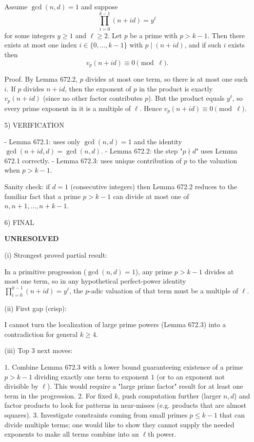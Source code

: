Assume $\gcd(n,d)=1$ and suppose
\[
\prod_{i=0}^{k-1}(n+id)=y^{\ell}
\]
for some integers $y\ge 1$ and $\ell\ge 2$.
Let $p$ be a prime with $p>k-1$. Then there exists at most one index $i\in\{0,\dots,k-1\}$ with $p\mid(n+id)$, and if such $i$ exists then
\[
 v_p(n+id)\equiv 0\pmod{\ell}.
\]

Proof.
By Lemma 672.2, $p$ divides at most one term, so there is at most one such $i$.
If $p$ divides $n+id$, then the exponent of $p$ in the product is exactly $v_p(n+id)$ (since no other factor contributes $p$). But the product equals $y^{\ell}$, so every prime exponent in it is a multiple of $\ell$. Hence $v_p(n+id)\equiv 0\pmod{\ell}$.


5) VERIFICATION

- Lemma 672.1: uses only $\gcd(n,d)=1$ and the identity $\gcd(n+id,d)=\gcd(n,d)$.
- Lemma 672.2: the step "$p\nmid d$" uses Lemma 672.1 correctly.
- Lemma 672.3: uses unique contribution of $p$ to the valuation when $p>k-1$.

Sanity check: if $d=1$ (consecutive integers) then Lemma 672.2 reduces to the familiar fact that a prime $p>k-1$ can divide at most one of $n,n+1,\dots,n+k-1$.

6) FINAL

\textbf{UNRESOLVED}

(i) Strongest proved partial result:

In a primitive progression ($\gcd(n,d)=1$), any prime $p>k-1$ divides at most one term, so in any hypothetical perfect-power identity $\prod_{i=0}^{k-1}(n+id)=y^{\ell}$, the $p$-adic valuation of that term must be a multiple of $\ell$.

(ii) First gap (crisp):

I cannot turn the localization of large prime powers (Lemma 672.3) into a contradiction for general $k\ge 4$.

(iii) Top 3 next moves:

1. Combine Lemma 672.3 with a lower bound guaranteeing existence of a prime $p>k-1$ dividing exactly one term to exponent $1$ (or to an exponent not divisible by $\ell$). This would require a "large prime factor" result for at least one term in the progression.
2. For fixed $k$, push computation further (larger $n,d$) and factor products to look for patterns in near-misses (e.g. products that are almost squares).
3. Investigate constraints coming from small primes $p\le k-1$ that can divide multiple terms; one would like to show they cannot supply the needed exponents to make all terms combine into an $\ell$th power.

